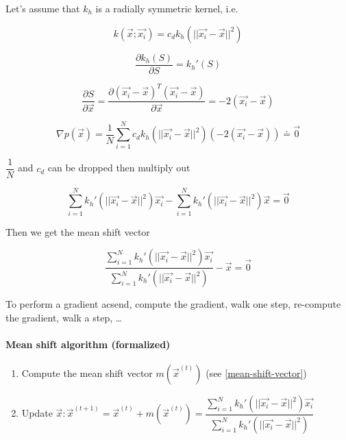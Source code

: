 Let's assume that $k_h$ is a radially symmetric kernel, i.e.\

\begin{equation*}
  k(\vec{x}; \vec{x_i}) = c_d k_h(||\vec{x_i} - \vec{x}||^2)
\end{equation*}

\begin{equation*}
  \dfrac{\partial k_h(S)}{\partial S} = k_h'(S)
\end{equation*}

\begin{equation*}
  \dfrac{\partial S}{\partial \vec{x}} = \dfrac{\partial{(\vec{x_i} - \vec{x})}^T (\vec{x_i} - \vec{x})}{\partial \vec{x}} = -2 (\vec{x_i} - \vec{x})
\end{equation*}

\begin{equation*}
  \nabla p(\vec{x}) = \dfrac{1}{N} \sum_{i=1}^N c_d k_h(||\vec{x_i} - \vec{x}||^2) (-2 (\vec{x_i} - \vec{x})) \doteq \vec{0}
\end{equation*}

$\dfrac{1}{N}$ and $c_d$ can be dropped then multiply out

\begin{equation*}
  \sum_{i=1}^N k_h'(||\vec{x_i} - \vec{x}||^2) \vec{x_i} - \sum_{i=1}^N k_h'(||\vec{x_i} - \vec{x}||^2) \vec{x} = \vec{0}
\end{equation*}

Then we get the mean shift vector

\begin{equation}
  \label{mean-shift-vector}
  \dfrac{\sum_{i=1}^N k_h'(||\vec{x_i} - \vec{x}||^2) \vec{x_i}}{\sum_{i=1}^N k_h'(||\vec{x_i} - \vec{x}||^2)} - \vec{x} = \vec{0}
\end{equation}

To perform a gradient acsend, compute the gradient, walk one step, re-compute the gradient, walk a step, \ldots

\paragraph{Mean shift algorithm (formalized)}
\begin{enumerate}
  \item Compute the mean shift vector $m(\vec{x}^{(t)})$ (see \ref{mean-shift-vector})
  \item Update $\vec{x}:\vec{x}^{(t+1)} = \vec{x}^{(t)} + m(\vec{x}^{(t)}) = \dfrac{\sum_{i=1}^N k_h'(||\vec{x_i} - \vec{x}||^2) \vec{x_i}}{\sum_{i=1}^N k_h'(||\vec{x_i} - \vec{x}||^2)}$
\end{enumerate}

